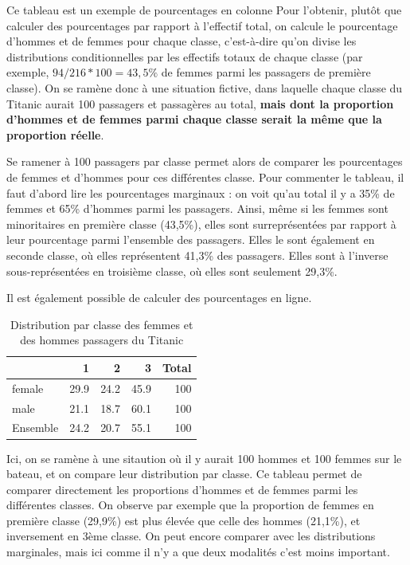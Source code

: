 \documentclass[
  french,
]{book}
\begin{document}
Ce tableau est un exemple de pourcentages en colonne Pour l'obtenir, plutôt que calculer des pourcentages par rapport à l'effectif total, on calcule le pourcentage d'hommes et de femmes pour chaque classe, c'est-à-dire qu'on divise les distributions conditionnelles par les effectifs totaux de chaque classe (par exemple, \(94/216*100 = 43,5 \%\) de femmes parmi les passagers de première classe). On se ramène donc à une situation fictive, dans laquelle chaque classe du Titanic aurait 100 passagers et passagères au total, \textbf{mais dont la proportion d'hommes et de femmes parmi chaque classe serait la même que la proportion réelle}.

Se ramener à 100 passagers par classe permet alors de comparer les pourcentages de femmes et d'hommes pour ces différentes classe. Pour commenter le tableau, il faut d'abord lire les pourcentages marginaux : on voit qu'au total il y a 35\% de femmes et 65\% d'hommes parmi les passagers. Ainsi, même si les femmes sont minoritaires en première classe (43,5\%), elles sont surreprésentées par rapport à leur pourcentage parmi l'ensemble des passagers. Elles le sont également en seconde classe, où elles représentent 41,3\% des passagers. Elles sont à l'inverse sous-représentées en troisième classe, où elles sont seulement 29,3\%.

Il est également possible de calculer des pourcentages en ligne.

\begin{table}

\caption{\label{tab:unnamed-chunk-19}Distribution par classe des femmes et des hommes passagers du Titanic}
\centering
\begin{tabular}[t]{l|r|r|r|r}
\hline
  & 1 & 2 & 3 & Total\\
\hline
female & 29.9 & 24.2 & 45.9 & 100\\
\hline
male & 21.1 & 18.7 & 60.1 & 100\\
\hline
Ensemble & 24.2 & 20.7 & 55.1 & 100\\
\hline
\end{tabular}
\end{table}

Ici, on se ramène à une sitaution où il y aurait 100 hommes et 100 femmes sur le bateau, et on compare leur distribution par classe. Ce tableau permet de comparer directement les proportions d'hommes et de femmes parmi les différentes classes. On observe par exemple que la proportion de femmes en première classe (29,9\%) est plus élevée que celle des hommes (21,1\%), et inversement en 3ème classe. On peut encore comparer avec les distributions marginales, mais ici comme il n'y a que deux modalités c'est moins important.
\end{document}
